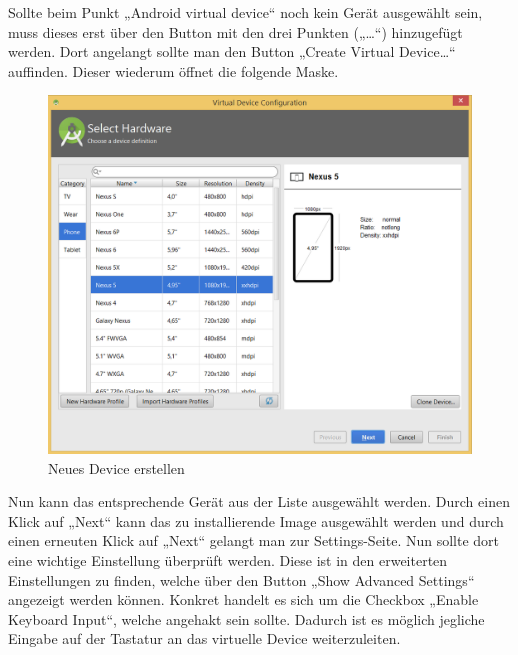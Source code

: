 Sollte beim Punkt „Android virtual device“ noch kein Gerät ausgewählt sein, muss dieses erst über den Button mit den drei Punkten („…“) hinzugefügt werden. Dort angelangt sollte man den Button „Create Virtual Device…“ auffinden. Dieser wiederum öffnet die folgende Maske.

\begin{figure}[H]
	\begin{center}
		\includegraphics[width=1.0\linewidth]{images/new_device.png}
		\caption{Neues Device erstellen}
		\label{Neues Device erstellen}
	\end{center}
\end{figure}

Nun kann das entsprechende Gerät aus der Liste ausgewählt werden. Durch einen Klick auf „Next“ kann das zu installierende Image ausgewählt werden und durch einen erneuten Klick auf „Next“ gelangt man zur Settings-Seite. Nun sollte dort eine wichtige Einstellung überprüft werden. Diese ist in den erweiterten Einstellungen zu finden, welche über den Button „Show Advanced Settings“ angezeigt werden können. Konkret handelt es sich um die Checkbox „Enable Keyboard Input“, welche angehakt sein sollte. Dadurch ist es möglich jegliche Eingabe auf der Tastatur an das virtuelle Device weiterzuleiten.

